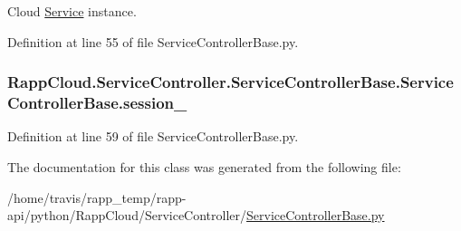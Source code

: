 Cloud \hyperlink{namespaceRappCloud_1_1Service}{Service} instance. 



Definition at line 55 of file Service\-Controller\-Base.\-py.

\hypertarget{classRappCloud_1_1ServiceController_1_1ServiceControllerBase_1_1ServiceControllerBase_a10a417e6895d6266493e9d2369d14fb4}{
\subsubsection[{session\-\_\-}]{\setlength{\rightskip}{0pt plus 5cm}Rapp\-Cloud.\-Service\-Controller.\-Service\-Controller\-Base.\-Service\-Controller\-Base.\-session\-\_\-}}\label{classRappCloud_1_1ServiceController_1_1ServiceControllerBase_1_1ServiceControllerBase_a10a417e6895d6266493e9d2369d14fb4}


Definition at line 59 of file Service\-Controller\-Base.\-py.



The documentation for this class was generated from the following file\-:\begin{DoxyCompactItemize}
\item 
/home/travis/rapp\-\_\-temp/rapp-\/api/python/\-Rapp\-Cloud/\-Service\-Controller/\hyperlink{ServiceControllerBase_8py}{Service\-Controller\-Base.\-py}\end{DoxyCompactItemize}
